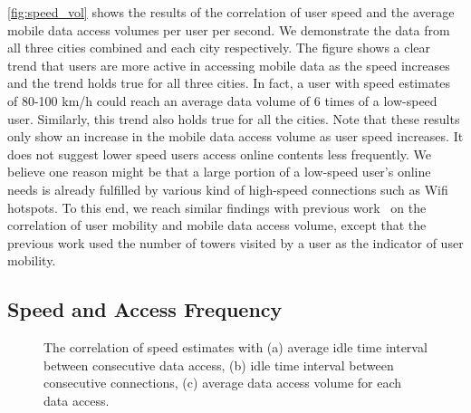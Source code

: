 \autoref{fig:speed_vol} shows the results of the correlation of user speed and the average mobile data access volumes per user per second. We demonstrate the data from all three cities combined and each city respectively. The figure shows a clear trend that users are more active in accessing mobile data as the speed increases and the trend holds true for all three cities. In fact, a user with speed estimates of 80-100 km/h could reach an average data volume of 6 times of a low-speed user. Similarly, this trend also holds true for all the cities. Note that these results only show an increase in the mobile data access volume as user speed increases. It does not suggest lower speed users access online contents less frequently. We believe one reason might be that a large portion of a low-speed user's online needs is already fulfilled by various kind of high-speed connections such as Wifi hotspots. To this end, we reach similar findings with previous work~\cite{yang2015characterizing} on the correlation of user mobility and mobile data access volume, except that the previous work used the number of towers visited by a user as the indicator of user mobility.

\subsection{Speed and Access Frequency}

\begin{figure}[h]
\centering
{}
\caption{The correlation of speed estimates with (a) average idle time interval between consecutive data access, (b) idle time interval between consecutive connections, (c) average data access volume for each data access.}
\label{fig:speed_corr}
\end{figure}


